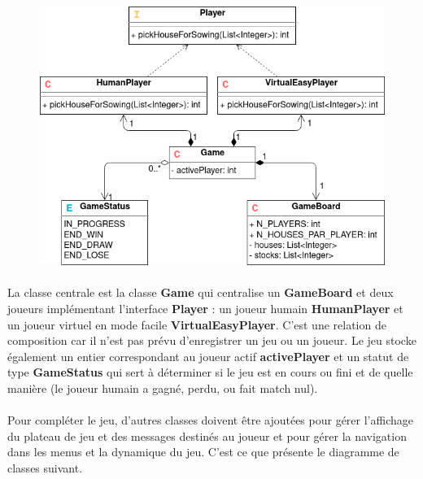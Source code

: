 \documentclass{article}
\begin{document}
    \begin{figure}[H]
        \centering
        \includegraphics[width=0.7\linewidth]{./schemas/classes1.png}
    \end{figure}

    \paragraph{}
    La classe centrale est la classe \textbf{Game} qui centralise un \textbf{GameBoard} et deux joueurs implémentant l'interface \textbf{Player} : un joueur humain \textbf{HumanPlayer} et un joueur virtuel en mode facile \textbf{VirtualEasyPlayer}. C'est une relation de composition car il n'est pas prévu d'enregistrer un jeu ou un joueur. Le jeu stocke également un entier correspondant au joueur actif \textbf{activePlayer} et un statut de type \textbf{GameStatus} qui sert à déterminer si le jeu est en cours ou fini et de quelle manière (le joueur humain a gagné, perdu, ou fait match nul).

    \paragraph{}
    Pour compléter le jeu, d'autres classes doivent être ajoutées pour gérer l'affichage du plateau de jeu et des messages destinés au joueur et pour gérer la navigation dans les menus et la dynamique du jeu. C'est ce que présente le diagramme de classes suivant.

    \newpage
\end{document}
